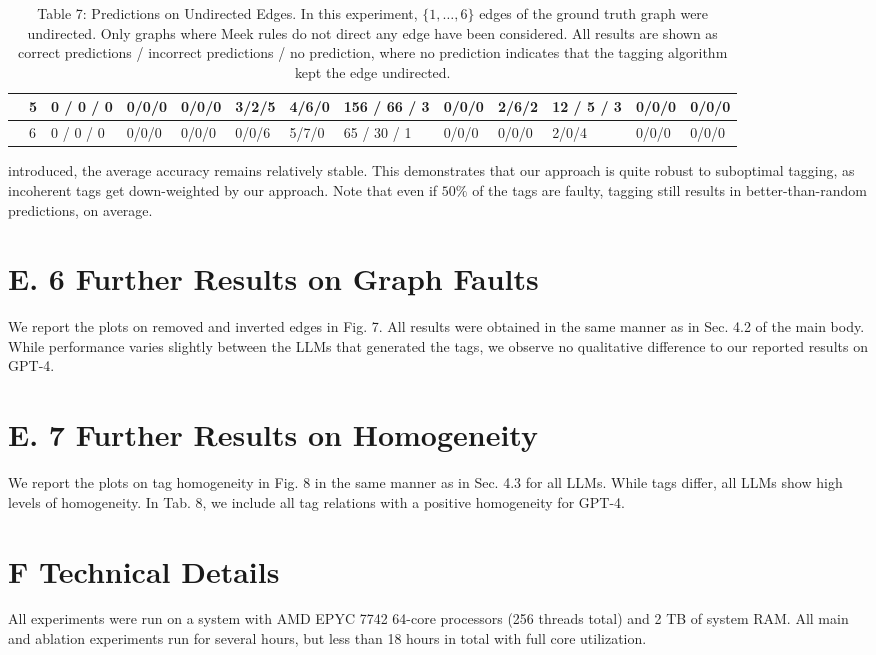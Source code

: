 \documentclass[10pt]{article}
\begin{document}
\begin{table}[h]
\begin{center}
\begin{tabular}{|l|l|l|l|l|l|l|l|l|l|l|l|l|}
\hline
 & 5 & 0 / 0 / 0 & 0/0/0 & 0/0/0 & 3/2/5 & 4/6/0 & 156 / 66 / 3 & 0/0/0 & 2/6/2 & 12 / 5 / 3 & 0/0/0 & 0/0/0 \\
\hline
 & 6 & 0 / 0 / 0 & 0/0/0 & 0/0/0 & 0/0/6 & 5/7/0 & 65 / 30 / 1 & 0/0/0 & 0/0/0 & 2/0/4 & 0/0/0 & 0/0/0 \\
\hline
\end{tabular}
\captionsetup{labelformat=empty}
\caption{Table 7: Predictions on Undirected Edges. In this experiment, $\{1, \ldots, 6\}$ edges of the ground truth graph were undirected. Only graphs where Meek rules do not direct any edge have been considered. All results are shown as correct predictions / incorrect predictions / no prediction, where no prediction indicates that the tagging algorithm kept the edge undirected.}
\end{center}
\end{table}

introduced, the average accuracy remains relatively stable. This demonstrates that our approach is quite robust to suboptimal tagging, as incoherent tags get down-weighted by our approach. Note that even if $50 \%$ of the tags are faulty, tagging still results in better-than-random predictions, on average.

\section*{E. 6 Further Results on Graph Faults}
We report the plots on removed and inverted edges in Fig. 7. All results were obtained in the same manner as in Sec. 4.2 of the main body. While performance varies slightly between the LLMs that generated the tags, we observe no qualitative difference to our reported results on GPT-4.

\section*{E. 7 Further Results on Homogeneity}
We report the plots on tag homogeneity in Fig. 8 in the same manner as in Sec. 4.3 for all LLMs. While tags differ, all LLMs show high levels of homogeneity. In Tab. 8, we include all tag relations with a positive homogeneity for GPT-4.

\section*{F Technical Details}
All experiments were run on a system with AMD EPYC 7742 64-core processors (256 threads total) and 2 TB of system RAM. All main and ablation experiments run for several hours, but less than 18 hours in total with full core utilization.
\end{document}
